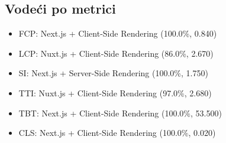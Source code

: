 \subsection{Vodeći po metrici}
\begin{itemize}
    \item FCP: Next.js + Client-Side Rendering (100.0\%, 0.840)
    \item LCP: Nuxt.js + Client-Side Rendering (86.0\%, 2.670)
    \item SI: Next.js + Server-Side Rendering (100.0\%, 1.750)
    \item TTI: Nuxt.js + Client-Side Rendering (97.0\%, 2.680)
    \item TBT: Next.js + Client-Side Rendering (100.0\%, 53.500)
    \item CLS: Next.js + Client-Side Rendering (100.0\%, 0.020)
\end{itemize}

